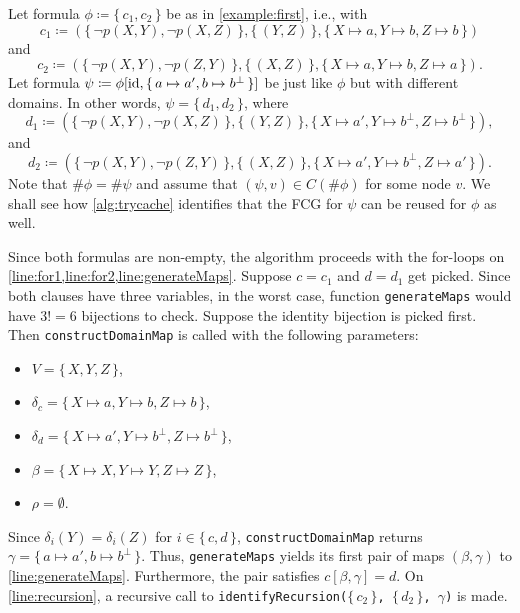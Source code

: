\begin{example} \label{example}

Let formula $\phi \coloneqq \{\, c_1, c_2 \,\}$ be as in \cref{example:first}, i.e., with
\[
c_1 \coloneqq (\{\, \neg p(X, Y), \neg p(X, Z) \,\}, \{\, (Y, Z) \,\}, \{\, X \mapsto a, Y \mapsto b, Z \mapsto b \,\})
\]
and
\[
c_2 \coloneqq (\{\, \neg p(X, Y), \neg p(Z, Y) \,\}, \{\, (X, Z) \,\}, \{\, X \mapsto a, Y \mapsto b, Z \mapsto a \,\}).
\]
Let formula $\psi \coloneqq \phi[\operatorname{id}, \{\, a \mapsto a', b \mapsto b^\bot \,\}]$ be just like $\phi$ but with different domains. In other words, $\psi = \{\, d_1, d_2 \,\}$, where
\[
d_1 \coloneqq (\{\, \neg p(X, Y), \neg p(X, Z) \,\}, \{\, (Y, Z) \,\}, \{\, X \mapsto a', Y \mapsto b^\bot, Z \mapsto b^\bot \,\}),
\]
and
\[
d_2 \coloneqq (\{\, \neg p(X, Y), \neg p(Z, Y) \,\}, \{\, (X, Z) \,\}, \{\, X \mapsto a', Y \mapsto b^\bot, Z \mapsto a' \,\}).
\]
Note that $\#\phi = \#\psi$ and assume that $(\psi, v) \in C(\#\phi)$ for some node $v$. We shall see how \cref{alg:trycache} identifies that the FCG for $\psi$ can be reused for $\phi$ as well.

Since both formulas are non-empty, the algorithm proceeds with the for-loops on \cref{line:for1,line:for2,line:generateMaps}. Suppose $c = c_1$ and $d = d_1$ get picked. Since both clauses have three variables, in the worst case, function \texttt{generateMaps} would have $3!=6$ bijections to check. Suppose the identity bijection is picked first. Then \texttt{constructDomainMap} is called with the following parameters:
\begin{itemize}
\item $V = \{\, X, Y, Z \,\}$,
\item $\delta_c = \{\, X \mapsto a, Y \mapsto b, Z \mapsto b \,\}$,
\item $\delta_d = \{\, X \mapsto a', Y \mapsto b^\bot, Z \mapsto b^\bot \,\}$,
\item $\beta = \{\, X \mapsto X, Y \mapsto Y, Z \mapsto Z \,\}$,
\item $\rho = \emptyset$.
\end{itemize}
Since $\delta_i(Y) = \delta_i(Z)$ for $i \in \{\, c, d \,\}$, \texttt{constructDomainMap} returns $\gamma = \{\, a \mapsto a', b \mapsto b^\bot \,\}$. Thus, \texttt{generateMaps} yields its first pair of maps $(\beta, \gamma)$ to \cref{line:generateMaps}. Furthermore, the pair satisfies $c[\beta, \gamma] = d$. On \cref{line:recursion}, a recursive call to \texttt{identifyRecursion($\{\,c_2\,\}$, $\{\,d_2\,\}$, $\gamma$)} is made.


\end{example}
